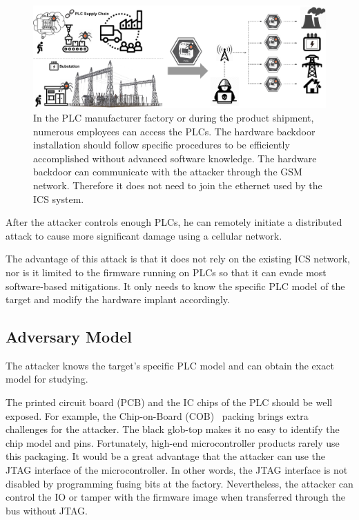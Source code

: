 \begin{figure}[ht]
	\includegraphics[width=\textwidth]{figures/bigpic}
	\centering
	\caption{In the PLC manufacturer factory or during the product shipment, numerous employees can access the PLCs. The hardware backdoor installation should follow specific procedures to be efficiently accomplished without advanced software knowledge. The hardware backdoor can communicate with the attacker through the GSM network. Therefore it does not need to join the ethernet used by the ICS system.}
	\label{fig:bigpic}
\end{figure}


After the attacker controls enough PLCs, he can remotely initiate a distributed attack to cause more significant damage using a cellular network. 

The advantage of this attack is that it does not rely on the existing ICS network, nor is it limited to the firmware running on PLCs so that it can evade most software-based mitigations. It only needs to know the specific PLC model of the target and modify the hardware implant accordingly.



\subsection{Adversary Model}


The attacker knows the target's specific PLC model and can obtain the exact model for studying.

The printed circuit board (PCB) and the IC chips of the PLC should be well exposed. For example, the Chip-on-Board (COB)~\cite{lau1994chip} packing brings extra challenges for the attacker. The black glob-top makes it no easy to identify the chip model and pins. Fortunately, high-end microcontroller products rarely use this packaging. It would be a great advantage that the attacker can use the JTAG interface of the microcontroller.  In other words, the JTAG interface is not disabled by programming fusing bits at the factory. Nevertheless, the attacker can control the IO or tamper with the firmware image when transferred through the bus without JTAG.

